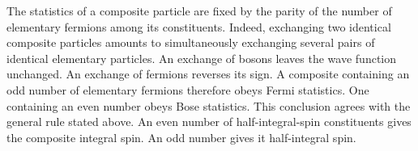 The statistics of a composite particle are fixed by the parity of the number of elementary fermions among its constituents.
Indeed, exchanging two identical composite particles amounts to simultaneously exchanging several pairs of identical elementary particles.
An exchange of bosons leaves the wave function unchanged.
An exchange of fermions reverses its sign.
A composite containing an odd number of elementary fermions therefore obeys Fermi statistics.
One containing an even number obeys Bose statistics.
This conclusion agrees with the general rule stated above.
An even number of half-integral-spin constituents gives the composite integral spin.
An odd number gives it half-integral spin.
